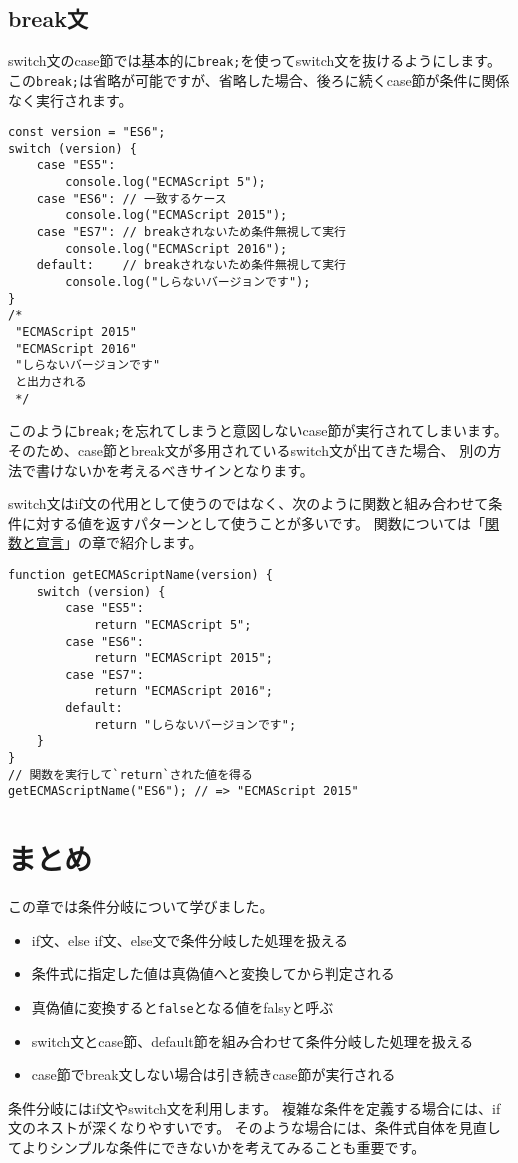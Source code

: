 \hypertarget{break-statement}{%
\subsection{break文}\label{break-statement}}

switch文のcase節では基本的に\texttt{break;}を使ってswitch文を抜けるようにします。
この\texttt{break;}は省略が可能ですが、省略した場合、後ろに続くcase節が条件に関係なく実行されます。

\begin{lstlisting}
const version = "ES6";
switch (version) {
    case "ES5":
        console.log("ECMAScript 5");
    case "ES6": // 一致するケース
        console.log("ECMAScript 2015");
    case "ES7": // breakされないため条件無視して実行
        console.log("ECMAScript 2016");
    default:    // breakされないため条件無視して実行
        console.log("しらないバージョンです");
}
/*
 "ECMAScript 2015"
 "ECMAScript 2016"
 "しらないバージョンです"
 と出力される
 */
 \end{lstlisting}

このように\texttt{break;}を忘れてしまうと意図しないcase節が実行されてしまいます。
そのため、case節とbreak文が多用されているswitch文が出てきた場合、
別の方法で書けないかを考えるべきサインとなります。

switch文はif文の代用として使うのではなく、次のように関数と組み合わせて条件に対する値を返すパターンとして使うことが多いです。
関数については「\href{../function-declaration/README.md}{関数と宣言}」の章で紹介します。

\begin{lstlisting}
function getECMAScriptName(version) {
    switch (version) {
        case "ES5":
            return "ECMAScript 5";
        case "ES6":
            return "ECMAScript 2015";
        case "ES7":
            return "ECMAScript 2016";
        default:
            return "しらないバージョンです";
    }
}
// 関数を実行して`return`された値を得る
getECMAScriptName("ES6"); // => "ECMAScript 2015"
\end{lstlisting}

\hypertarget{conclusion}{%
\section{まとめ}\label{conclusion}}

この章では条件分岐について学びました。

\begin{itemize}
\item
  if文、else if文、else文で条件分岐した処理を扱える
\item
  条件式に指定した値は真偽値へと変換してから判定される
\item
  真偽値に変換すると\texttt{false}となる値をfalsyと呼ぶ
\item
  switch文とcase節、default節を組み合わせて条件分岐した処理を扱える
\item
  case節でbreak文しない場合は引き続きcase節が実行される
\end{itemize}

条件分岐にはif文やswitch文を利用します。
複雑な条件を定義する場合には、if文のネストが深くなりやすいです。
そのような場合には、条件式自体を見直してよりシンプルな条件にできないかを考えてみることも重要です。
